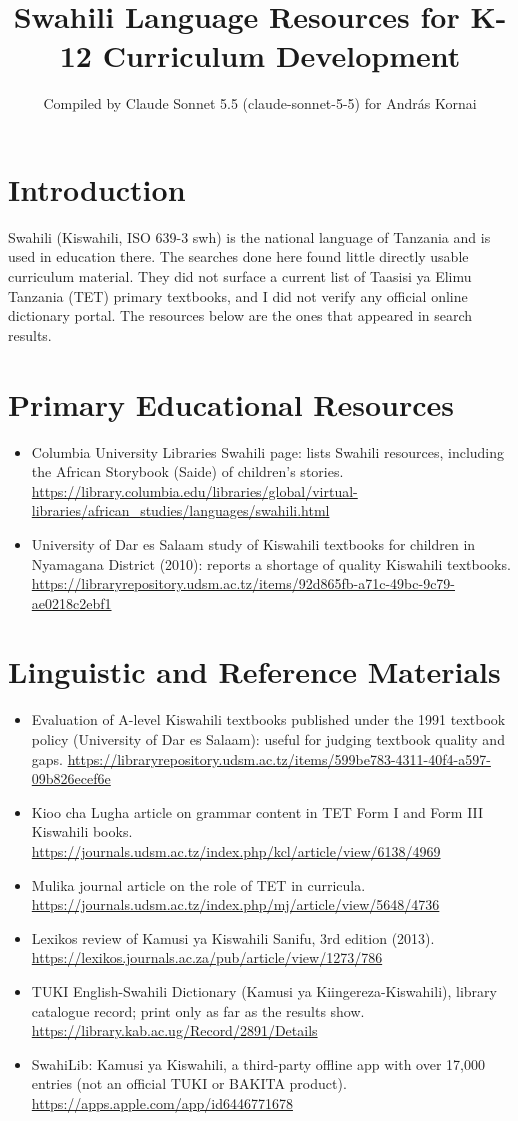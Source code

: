 \documentclass[12pt]{article}
\title{Swahili Language Resources for K-12 Curriculum Development}
\author{Compiled by Claude Sonnet 5.5 (claude-sonnet-5-5) for Andr\'as Kornai}
\date{}
\begin{document}
\maketitle

\section{Introduction}
Swahili (Kiswahili, ISO 639-3 swh) is the national language of Tanzania and is used in education there. The searches done here found little directly usable curriculum material. They did not surface a current list of Taasisi ya Elimu Tanzania (TET) primary textbooks, and I did not verify any official online dictionary portal. The resources below are the ones that appeared in search results.

\section{Primary Educational Resources}
\begin{itemize}
\item Columbia University Libraries Swahili page: lists Swahili resources, including the African Storybook (Saide) of children's stories. \url{https://library.columbia.edu/libraries/global/virtual-libraries/african_studies/languages/swahili.html}
\item University of Dar es Salaam study of Kiswahili textbooks for children in Nyamagana District (2010): reports a shortage of quality Kiswahili textbooks. \url{https://libraryrepository.udsm.ac.tz/items/92d865fb-a71c-49bc-9c79-ae0218c2ebf1}
\end{itemize}

\section{Linguistic and Reference Materials}
\begin{itemize}
\item Evaluation of A-level Kiswahili textbooks published under the 1991 textbook policy (University of Dar es Salaam): useful for judging textbook quality and gaps. \url{https://libraryrepository.udsm.ac.tz/items/599be783-4311-40f4-a597-09b826ecef6e}
\item Kioo cha Lugha article on grammar content in TET Form I and Form III Kiswahili books. \url{https://journals.udsm.ac.tz/index.php/kcl/article/view/6138/4969}
\item Mulika journal article on the role of TET in curricula. \url{https://journals.udsm.ac.tz/index.php/mj/article/view/5648/4736}
\item Lexikos review of Kamusi ya Kiswahili Sanifu, 3rd edition (2013). \url{https://lexikos.journals.ac.za/pub/article/view/1273/786}
\item TUKI English-Swahili Dictionary (Kamusi ya Kiingereza-Kiswahili), library catalogue record; print only as far as the results show. \url{https://library.kab.ac.ug/Record/2891/Details}
\item SwahiLib: Kamusi ya Kiswahili, a third-party offline app with over 17,000 entries (not an official TUKI or BAKITA product). \url{https://apps.apple.com/app/id6446771678}
\end{itemize}
\end{document}
